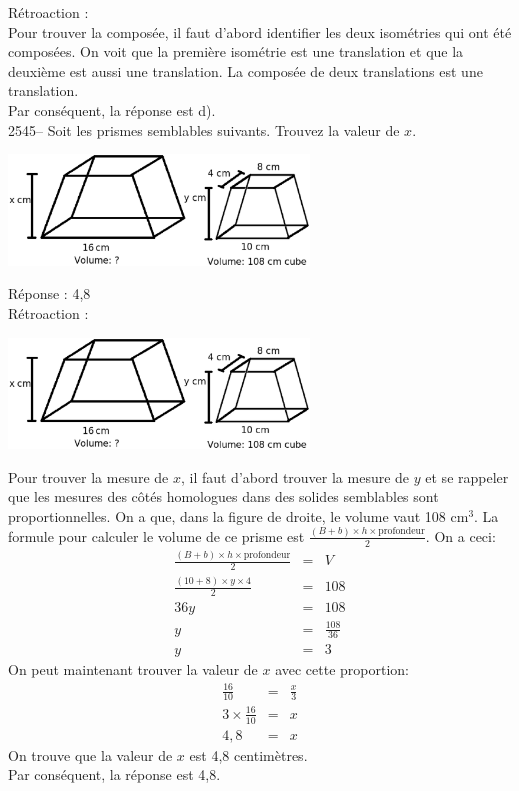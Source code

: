 \documentclass[letterpaper, 12pt]{article}
\begin{document}
R\'etroaction :\\
Pour trouver la compos\'ee, il faut d'abord identifier les deux isom\'etries qui ont \'et\'e compos\'ees. On voit que la premi\`ere isom\'etrie est une translation et que la deuxi\`eme est aussi une translation. La compos\'ee de deux translations est une translation.\\
Par cons\'equent, la r\'eponse est d).\\


2545-- Soit les prismes semblables suivants. Trouvez la valeur de $x$.\\
\begin{center}
 \includegraphics[width=8cm,bb=0 532 724 842]{Q2545.eps}
\end{center}

R\'eponse : 4,8\\

R\'etroaction :\\
\begin{center}
 \includegraphics[width=8cm,bb=0 532 724 842]{Q2545.eps}
\end{center}
Pour trouver la mesure de $x$, il faut d'abord trouver la mesure de $y$ et se rappeler que les mesures des c\^ot\'es homologues dans des solides semblables sont proportionnelles. On a que, dans la figure de droite, le volume vaut 108 cm$^{3}$. La formule pour calculer le volume de ce prisme est $\frac{(B + b)\times h \times \textrm{profondeur}}{2}$. On a ceci:
\begin{eqnarray*}
 \frac{(B + b)\times h \times \textrm{profondeur}}{2}&=&V\\[2mm]
 \frac{(10 + 8)\times y \times 4}{2}&=&108\\[2mm]
 36 y &=&108\\[2mm]
 y &=&\frac{108}{36}\\[2mm]
 y &=&3
\end{eqnarray*}
On peut maintenant trouver la valeur de $x$ avec cette proportion:
\begin{eqnarray*}
 \frac{16}{10}&=&\frac{x}{3}\\[2mm]
 3 \times \frac{16}{10}&=&x\\[2mm]
 4,8&=&x
\end{eqnarray*}
On trouve que la valeur de $x$ est 4,8 centim\`etres.\\
Par cons\'equent, la r\'eponse est 4,8.\\
\end{document}

